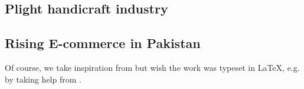 \subsection{Plight handicraft industry}

\subsection{Rising E-commerce in Pakistan}




























Of course, we take inspiration from \cite{einstein} but wish the work was typeset in \LaTeX \cite{knuthwebsite}, e.g. by taking help from \cite{latexcompanion}.